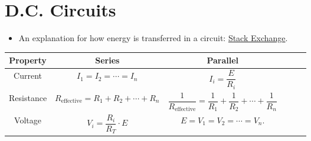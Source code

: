 \documentclass[oneside]{book}
\begin{document}
\chapter{D.C. Circuits}
\begin{itemize}
    \item An explanation for how energy is transferred in a circuit: \href{https://physics.stackexchange.com/a/569312}{Stack Exchange}.
\end{itemize}
\begin{center}
    \begin{tabular}{|Sc|Sc|Sc|}
        \hline
        Property & Series & Parallel\\
        \hline
        Current & \(I_1=I_2=\cdots=I_n\) & \(I_i=\dfrac{E}{R_i}\)\\
        \hline
        Resistance & \(R_{\text{effective}}=R_1+R_2+\cdots+R_n\) & \(\dfrac{1}{R_{\text{effective}}}=\dfrac{1}{R_1}+\dfrac{1}{R_2}+\cdots+\dfrac{1}{R_n}\)\\
        \hline
        Voltage & \(V_i=\dfrac{R_i}{R_T}\cdot E\) & \(E=V_1=V_2=\cdots=V_n\).\\
        \hline
    \end{tabular}
\end{center}
\end{document}
